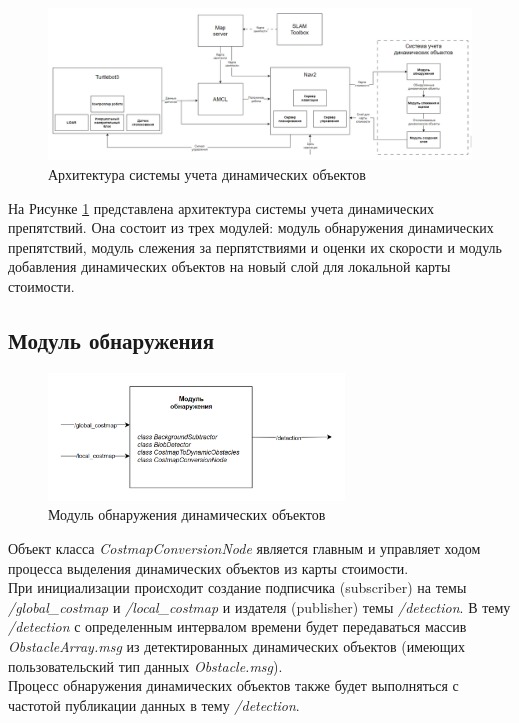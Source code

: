 \begin{figure}[h]
    \centering
    \includegraphics[width=1.0\textwidth]{images/chap_3/dyn_obs_av_sys_arch.png}
    \caption{Архитектура системы учета динамических объектов}
    \label{fig:dyn_obs_av_sys_arch}
\end{figure}

На Рисунке \ref*{fig:dyn_obs_av_sys_arch} представлена архитектура системы учета динамических препятствий. Она состоит из трех модулей: модуль обнаружения динамических препятствий, модуль слежения за перпятствиями и оценки их скорости и модуль добавления динамических объектов на новый слой для локальной карты стоимости.

\subsection{Модуль обнаружения}

\begin{figure}[h]
    \centering
    \includegraphics[width=0.7\textwidth]{images/chap_3/costmap_conversion.png}
    \caption{Модуль обнаружения динамических объектов}
    \label{fig:costmap_conversion}
\end{figure}

Объект класса \textit{CostmapConversionNode} является главным и управляет ходом процесса выделения динамических объектов из карты стоимости. \\ 
При инициализации происходит создание подписчика (subscriber) на темы \textit{/global\_costmap} и \textit{/local\_costmap} и издателя (publisher) темы \textit{/detection}. В тему \textit{/detection} с определенным интервалом времени будет передаваться массив \textit{ObstacleArray.msg} из детектированных динамических объектов (имеющих пользовательский тип данных \textit{Obstacle.msg}). \\
Процесс обнаружения динамических объектов также будет выполняться с частотой публикации данных в тему \textit{/detection}.

